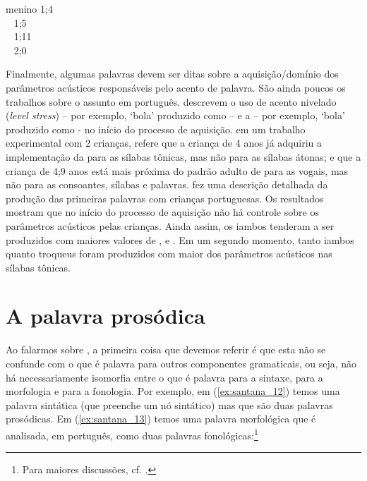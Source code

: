 \documentclass[output=paper]{LSP/langsci}
\begin{document}
\ea\label{ex:santana_11}
\gllll menino {\ipa{[mi]} 1;4}\\
~ {\ipa{[me] [a\pstr mi] [mi\pstr mi]} 1;5}\\
~ {\ipa{[mi\pstr ni.nu]} 1;11}\\
~ {\ipa{[mi\pstr ni.nu] [\pstr mi.nu]} 2;0}\\
\z

Finalmente, algumas palavras devem ser ditas sobre a aquisição/domínio dos parâmetros acústicos responsáveis pelo acento de palavra. São ainda poucos os trabalhos sobre o assunto em português. \citet{frotavigario2008} descrevem o uso de acento nivelado (\textit{level stress}) – por exemplo, `bola' produzido como  – e a  – por exemplo, `bola' produzido como \ipa{[pa\pstr pa]} - no início do processo de aquisição. \citet{gamarossi1999} em um trabalho experimental com 2 crianças, refere que a criança de 4 anos já adquiriu a implementação da  para as sílabas tônicas, mas não para as sílabas átonas; e que a criança de 4;9 anos está mais próxima do padrão adulto de  para as vogais, mas não para as consoantes, sílabas e palavras. \citet{correia2009} fez uma descrição detalhada da produção das primeiras palavras com crianças portuguesas. Os resultados mostram que no início do processo de aquisição não há controle sobre os parâmetros acústicos pelas crianças. Ainda assim, os iambos tenderam a ser produzidos com maiores valores de ,  e . Em um segundo momento, tanto iambos quanto troqueus foram produzidos com maior  dos parâmetros acústicos nas sílabas tônicas.
 
\section{A palavra prosódica}
\label{sec:santana_palavra_prosodica}

Ao falarmos sobre , a primeira coisa que devemos referir é que esta não se confunde com o que é palavra para outros componentes gramaticais, ou seja, não há necessariamente isomorfia entre o que é palavra para a sintaxe, para a morfologia e para a fonologia. Por exemplo, em (\ref{ex:santana_12}) temos uma palavra sintática (que preenche um nó sintático) mas que são duas palavras prosódicas. Em (\ref{ex:santana_13}) temos uma palavra morfológica que é analisada, em português, como duas palavras fonológicas:\footnote{Para maiores discussões, cf. \citealt{mateusdandrade2000}.}
\end{document}
